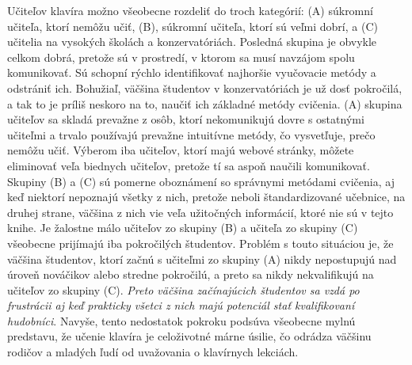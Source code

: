 Učiteľov klavíra možno všeobecne rozdeliť do troch kategórií: (A) súkromní učiteľa, ktorí nemôžu učiť, (B), súkromní učiteľa, ktorí sú veľmi dobrí, a (C) učitelia na vysokých školách a konzervatóriách. Posledná skupina je obvykle celkom dobrá, pretože sú v prostredí, v ktorom sa musí navzájom spolu komunikovať. Sú schopní rýchlo identifikovať najhoršie vyučovacie metódy a odstrániť ich. Bohužiaľ, väčšina študentov v konzervatóriách je už dosť pokročilá, a tak to je príliš neskoro na to, naučiť ich základné metódy cvičenia. (A) skupina učiteľov sa skladá prevažne z osôb, ktorí nekomunikujú dovre s ostatnými učiteľmi a trvalo používajú prevažne intuitívne metódy, čo vysvetľuje, prečo nemôžu učiť. Výberom iba učiteľov, ktorí majú webové stránky, môžete eliminovať veľa biednych učiteľov, pretože tí sa aspoň naučili komunikovať. Skupiny (B) a (C) sú pomerne oboznámení so správnymi metódami cvičenia, aj keď niektorí nepoznajú všetky z nich, pretože neboli štandardizované učebnice, na druhej strane, väčšina z nich vie veľa užitočných informácií, ktoré nie sú v tejto knihe. Je žalostne málo učiteľov zo skupiny (B) a učiteľa zo skupiny (C) všeobecne prijímajú iba pokročilých študentov. Problém s touto situáciou je, že väčšina študentov, ktorí začnú s učiteľmi zo skupiny (A) nikdy nepostupujú nad úroveň nováčikov alebo stredne pokročilú, a preto sa nikdy nekvalifikujú na učiteľov zo skupiny (C). \emph{Preto väčšina začínajúcich študentov sa vzdá po frustrácii aj keď prakticky všetci z nich majú potenciál stať kvalifikovaní hudobníci}. Navyše, tento nedostatok pokroku podsúva všeobecne mylnú predstavu, že učenie klavíra je celoživotné  márne úsilie, čo odrádza väčšinu rodičov a mladých ľudí od uvažovania o klavírnych lekciách.

